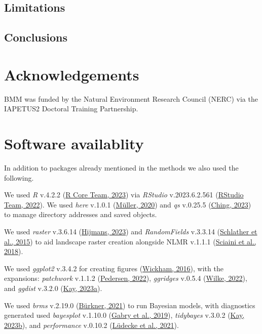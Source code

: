 \documentclass[10pt,a4paper]{article}
\begin{document}
\hypertarget{limitations}{%
\subsection{Limitations}\label{limitations}}

\hypertarget{conclusions}{%
\subsection{Conclusions}\label{conclusions}}

\hypertarget{acknowledgements}{%
\section{Acknowledgements}\label{acknowledgements}}

BMM was funded by the Natural Environment Research Council (NERC) via the IAPETUS2 Doctoral Training Partnership.

\hypertarget{software-availablity}{%
\section{Software availablity}\label{software-availablity}}

In addition to packages already mentioned in the methods we also used the following.

We used \emph{R} v.4.2.2 (\protect\hyperlink{ref-base}{R Core Team, 2023}) via \emph{RStudio} v.2023.6.2.561 (\protect\hyperlink{ref-rstudio}{RStudio Team, 2022}).
We used \emph{here} v.1.0.1 (\protect\hyperlink{ref-here}{Müller, 2020}) and \emph{qs} v.0.25.5 (\protect\hyperlink{ref-qs}{Ching, 2023}) to manage directory addresses and saved objects.

We used \emph{raster} v.3.6.14 (\protect\hyperlink{ref-raster}{Hijmans, 2023}) and \emph{RandomFields} v.3.3.14 (\protect\hyperlink{ref-RandomFields}{Schlather et al., 2015}) to aid landscape raster creation alongside NLMR v.1.1.1 (\protect\hyperlink{ref-NLMR}{Sciaini et al., 2018}).

We used \emph{ggplot2} v.3.4.2 for creating figures (\protect\hyperlink{ref-ggplot2}{Wickham, 2016}), with the expansions: \emph{patchwork} v.1.1.2 (\protect\hyperlink{ref-patchwork}{Pedersen, 2022}), \emph{ggridges} v.0.5.4 (\protect\hyperlink{ref-ggridges}{Wilke, 2022}), and \emph{ggdist} v.3.2.0 (\protect\hyperlink{ref-ggdist}{Kay, 2023a}).

We used \emph{brms} v.2.19.0 (\protect\hyperlink{ref-brms}{Bürkner, 2021}) to run Bayesian models, with diagnostics generated used \emph{bayesplot} v.1.10.0 (\protect\hyperlink{ref-bayesplot}{Gabry et al., 2019}), \emph{tidybayes} v.3.0.2 (\protect\hyperlink{ref-tidybayes}{Kay, 2023b}), and \emph{performance} v.0.10.2 (\protect\hyperlink{ref-performance}{Lüdecke et al., 2021}).
\end{document}
